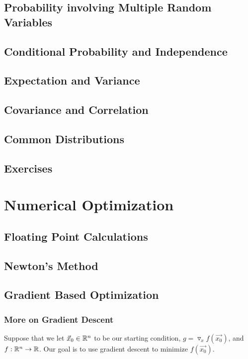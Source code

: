 \section{Probability involving Multiple Random Variables} 

\section{Conditional Probability and Independence}  

\section{Expectation and Variance}  

\section{Covariance and Correlation}

\section{Common Distributions}

\section{Exercises}

\chapter{Numerical Optimization}
\label{numerics}

\section{Floating Point Calculations}

\section{Newton's Method}

\section{Gradient Based Optimization}
\label{gradient-optimization}

\subsection{More on Gradient Descent}
\label{gradient descent}
Suppose that we let $\vec{x}_0\in \R^n$ to be our starting condition,
$g=\triangledown_x f(\vec{x_0})$, and $f: \R^n\rightarrow\R$.
Our goal is to use gradient descent to minimize $f(\vec{x_0})$.

